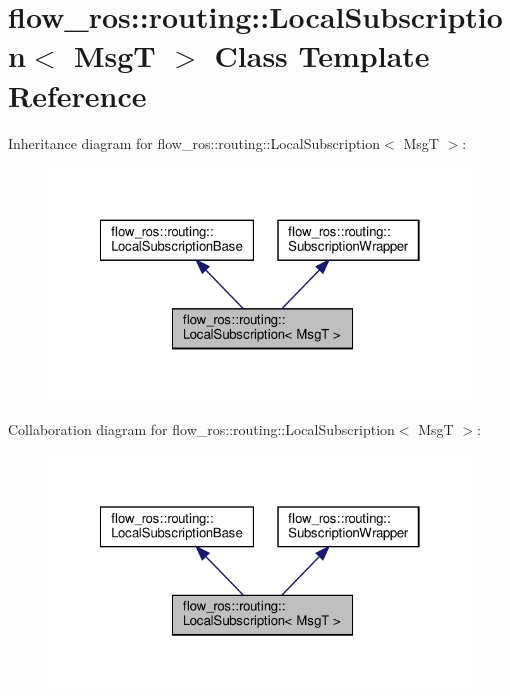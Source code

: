 \hypertarget{classflow__ros_1_1routing_1_1_local_subscription}{}\section{flow\+\_\+ros\+:\+:routing\+:\+:Local\+Subscription$<$ MsgT $>$ Class Template Reference}
\label{classflow__ros_1_1routing_1_1_local_subscription}


Inheritance diagram for flow\+\_\+ros\+:\+:routing\+:\+:Local\+Subscription$<$ MsgT $>$\+:\nopagebreak
\begin{figure}[H]
\begin{center}
\leavevmode
\includegraphics[width=322pt]{classflow__ros_1_1routing_1_1_local_subscription__inherit__graph}
\end{center}
\end{figure}


Collaboration diagram for flow\+\_\+ros\+:\+:routing\+:\+:Local\+Subscription$<$ MsgT $>$\+:\nopagebreak
\begin{figure}[H]
\begin{center}
\leavevmode
\includegraphics[width=322pt]{classflow__ros_1_1routing_1_1_local_subscription__coll__graph}
\end{center}
\end{figure}
